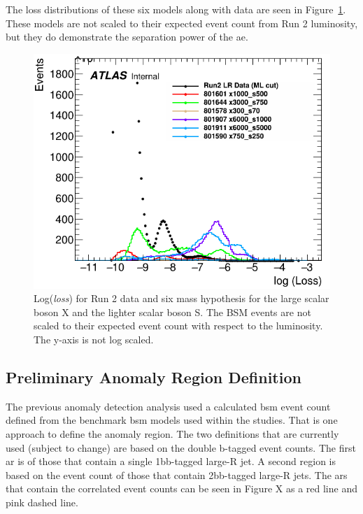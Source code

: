 The loss distributions of these six models along with data are seen in Figure~\ref{fig:sh4b-bsm-data-nolog}. These models are not scaled to their expected event count from Run 2 luminosity, but they 
do demonstrate the separation power of the \gls{ae}.


\begin{figure}[ht]
    \centering
    \includegraphics[scale=0.6]{figs/ch7/loss_data1percent_nolog_BSM.png}%
    \caption{Log(\textit{loss}) for Run 2 data and six mass hypothesis for the large scalar boson X and the lighter scalar boson S. The BSM events are not scaled to their expected 
    event count with respect to the luminosity. The y-axis is not log scaled.}
\label{fig:sh4b-bsm-data-nolog}
\end{figure}

\subsection{Preliminary Anomaly Region Definition}

The previous anomaly detection analysis used a calculated \gls{bsm} event count defined from the benchmark \gls{bsm} models used within the studies. That is one approach to 
define the anomaly region. The two definitions that are currently used (subject to change) are based on the double b-tagged event counts. The first \gls{ar} is of those 
that contain a single 1bb-tagged large-R jet. A second region is based on the event count of those that contain 2bb-tagged large-R jets. The \gls{ar}s that contain the 
correlated event counts can be seen in Figure X as a red line and pink dashed line. 

